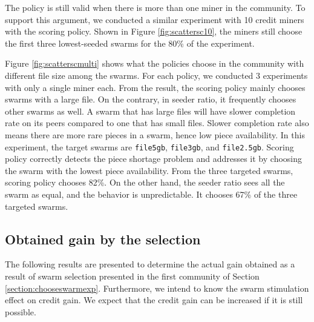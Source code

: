 The policy is still valid when there is more than one miner in the community. To support this argument, we conducted a similar experiment with 10 credit miners with the scoring policy. Shown in Figure \ref{fig:scattersc10}, the miners still choose the first three lowest-seeded swarms for the 80\% of the experiment. 

Figure \ref{fig:scatterscmulti} shows what the policies choose in the community with different file size among the swarms. For each policy, we conducted 3 experiments with only a single miner each. From the result, the scoring policy mainly chooses swarms with a large file. On the contrary, in seeder ratio, it frequently chooses other swarms as well. A swarm that has large files will have slower completion rate on its peers compared to one that has small files. Slower completion rate also means there are more rare pieces in a swarm, hence low piece availability. In this experiment, the target swarms are \texttt{file5gb}, \texttt{file3gb}, and \texttt{file2.5gb}. Scoring policy correctly detects the piece shortage problem and addresses it by choosing the swarm with the lowest piece availability. From the three targeted swarms, scoring policy chooses 82\%. On the other hand, the seeder ratio sees all the swarm as equal, and the behavior is unpredictable. It chooses 67\% of the three targeted swarms.

\subsection{Obtained gain by the selection}
\label{section:resultgain}
The following results are presented to determine the actual gain obtained as a result of swarm selection presented in the first community of Section \ref{section:chooseswarmexp}. Furthermore, we intend to know the swarm stimulation effect on credit gain. We expect that the credit gain can be increased if it is still possible.



